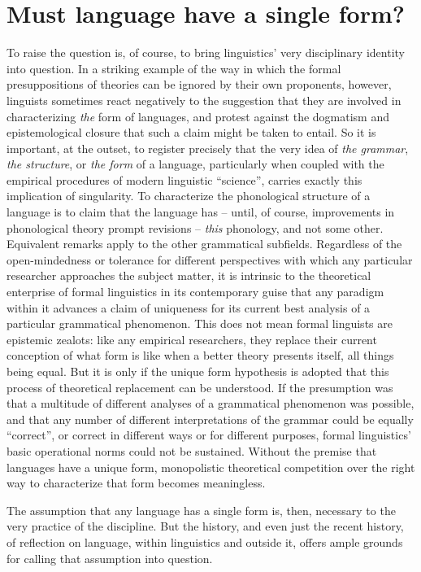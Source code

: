 \documentclass[output=paper]{langscibook}
\begin{document}
\section{Must language have a single form?}
\label{sec:riemer:singleform}

To raise the question is, of course, to bring linguistics' very disciplinary identity into question. In a striking example of the way in which the formal presuppositions of theories can be ignored by their own proponents, however, linguists sometimes react negatively to the suggestion that they are involved in characterizing \emph{the} form of languages, and protest against the dogmatism and epistemological closure that such a claim might be taken to entail. So it is important, at the outset, to register precisely that the very idea of \emph{the grammar}, \emph{the structure}, or \emph{the form} of a language, particularly when coupled with the empirical procedures of modern linguistic ``science'', carries exactly this implication of singularity. To characterize the phonological structure of a language is to claim that the language has -- until, of course, improvements in phonological theory prompt revisions -- \emph{this} phonology, and not some other. Equivalent remarks apply to the other grammatical subfields. Regardless of the open-mindedness or tolerance for different perspectives with which any particular researcher approaches the subject matter, it is intrinsic to the theoretical enterprise of formal linguistics in its contemporary guise that any paradigm within it advances a claim of uniqueness for its current best analysis of a particular grammatical phenomenon. This does not mean formal linguists are epistemic zealots: like any empirical researchers, they replace their current conception of what form is like when a better theory presents itself, all things being equal. But it is only if the unique form hypothesis is adopted that this process of theoretical replacement can be understood. If the presumption was that a multitude of different analyses of a grammatical phenomenon was possible, and that any number of different interpretations of the grammar could be equally ``correct'', or correct in different ways or for different purposes, formal linguistics' basic operational norms could not be sustained. Without the premise that languages have a unique form, monopolistic theoretical competition over the right way to characterize that form becomes meaningless.

The assumption that any language has a single form is, then, necessary to the very practice of the discipline. But the history, and even just the recent history, of reflection on language, within linguistics and outside it, offers ample grounds for calling that assumption into question.
\end{document}
